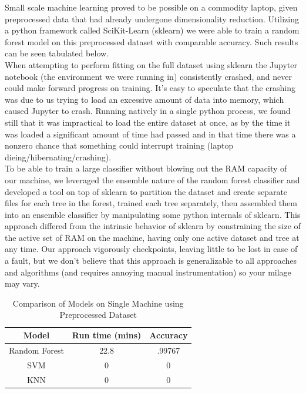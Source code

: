 \documentclass{neu_handout}
\begin{document}
Small scale machine learning proved to be possible on a commodity laptop, given preprocessed data that had already undergone dimensionality reduction. Utilizing a python framework called SciKit-Learn (sklearn) we were able to train a random forest model on this preprocessed dataset with comparable accuracy. Such results can be seen tabulated below.\\

When attempting to perform fitting on the full dataset using sklearn the Jupyter notebook (the environment we were running in) consistently crashed, and never could make forward progress on training. It's easy to speculate that the crashing was due to us trying to load an excessive amount of data into memory, which caused Jupyter to crash. Running natively in a single python process, we found still that it was impractical to load the entire dataset at once, as by the time it was loaded a significant amount of time had passed and in that time there was a nonzero chance that something could interrupt training (laptop dieing/hibernating/crashing).\\

To be able to train a large classifier without blowing out the RAM capacity of our machine, we leveraged the ensemble nature of the random forest classifier and developed a tool on top of sklearn to partition the dataset and create separate files for each tree in the forest, trained each tree separately, then assembled them into an ensemble classifier by manipulating some python internals of sklearn. This approach differed from the intrinsic behavior of sklearn by constraining the size of the active set of RAM on the machine, having only one active dataset and tree at any time. Our approach vigorously checkpoints, leaving little to be lost in case of a fault, but we don't believe that this approach is generalizable to all approaches and algorithms (and requires annoying manual instrumentation) so your milage may vary.

\begin{table}[h!]
\centering
 \begin{tabular}{||c c c||} 
 \hline
Model & Run time (mins) & Accuracy \\ [0.5ex] 
 \hline\hline
Random Forest & 22.8  & .99767   \\[1ex] 
 \hline
 SVM & 0  & 0 \\
\hline
KNN & 0  & 0 \\
\hline
 \end{tabular}
 \caption{Comparison of Models on Single Machine using Preprocessed Dataset}
 \label{tab:accuracy-comparison}
\end{table}
\end{document}
